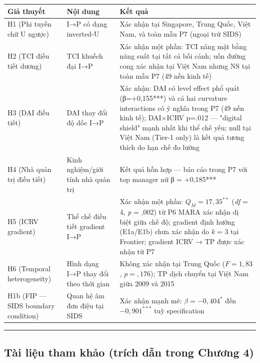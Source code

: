 \documentclass[12pt,a4paper]{article}
\begin{document}
\begin{longtable}[]{@{}lll@{}}
\toprule\noalign{}
Giả thuyết & Nội dung & Kết quả \\
\midrule\noalign{}
\endhead
\bottomrule\noalign{}
\endlastfoot
H1 (Phi tuyến chữ U ngược) & I→P có dạng inverted-U & Xác nhận tại
Singapore, Trung Quốc, Việt Nam, và toàn mẫu P7 (ngoại trừ SIDS) \\
H2 (TCI điều tiết dương) & TCI khuếch đại I→P & Xác nhận một phần: TCI
nâng mặt bằng năng suất tại tất cả bối cảnh; uốn đường cong xác nhận tại
Việt Nam nhưng NS tại toàn mẫu P7 (49 nền kinh tế) \\
H3 (DAI điều tiết) & DAI thay đổi độ dốc I→P & Xác nhận: DAI có level
effect phổ quát (β=+0,155***) và cả hai curvature interactions có ý
nghĩa trong P7 (49 nền kinh tế); DAI×ICRV p=.012 --- "digital shield"
mạnh nhất khi thể chế yếu; null tại Việt Nam (Tier-1 only) là kết quả
tương thích do hạn chế đo lường \\
H4 (Nhà quản trị điều tiết) & Kinh nghiệm/giới tính nhà quản trị & Kết
quả hỗn hợp --- báo cáo trong P7 với top manager nữ β = +0,185*** \\
H5 (ICRV gradient) & Thể chế điều tiết gradient I→P & Xác nhận một phần:
\(Q_M = 17{,}35^{**}\) (\emph{df} = 4, \emph{p} = ,002) từ P6 MARA xác
nhận dị biệt giữa chế độ; gradient định hướng (E1a/E1b) chưa xác nhận do
\emph{k} = 3 tại Frontier; gradient ICRV → TP được xác nhận từ P7 \\
H6 (Temporal heterogeneity) & Hình dạng I→P thay đổi theo thời gian &
Không xác nhận tại Trung Quốc (\(F = 1{,}83\), \(p = {,}176\)); TP dịch
chuyển tại Việt Nam giữa 2009 và 2015 \\
H1b (FIP --- SIDS boundary condition) & Quan hệ âm đơn điệu tại SIDS &
Xác nhận mạnh mẽ: \(\beta = -0{,}404^{*}\) đến \(-0{,}901^{***}\) tuỳ
specification \\
\end{longtable}

\begin{center}\rule{0.5\linewidth}{0.5pt}\end{center}

\hypertarget{tuxe0i-liux1ec7u-tham-khux1ea3o-truxedch-dux1eabn-trong-chux1b0ux1a1ng-4}{%
\subsection{Tài liệu tham khảo (trích dẫn trong Chương
4)}\label{tuxe0i-liux1ec7u-tham-khux1ea3o-truxedch-dux1eabn-trong-chux1b0ux1a1ng-4}}
\end{document}
